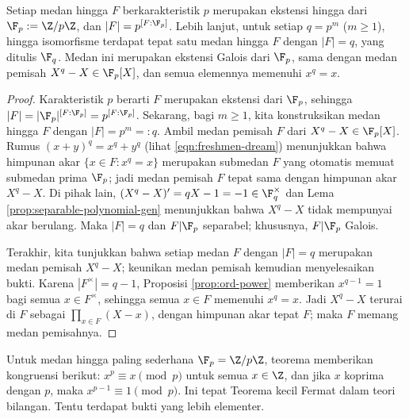 \begin{theorem}\label{prop:finite-field-uniqueness} 
	Setiap medan hingga $F$ berkarakteristik $p$ merupakan ekstensi hingga dari $\F_p:=\Z/p\Z$, dan $|F|=p^{[F:\F_p]}$. Lebih lanjut, untuk setiap $q=p^m$ ($m\geq1$), hingga isomorfisme terdapat tepat satu medan hingga $F$ dengan $|F|=q$, yang ditulis $\F_q$. Medan ini merupakan ekstensi Galois dari $\F_p$, sama dengan medan pemisah $X^q-X\in\F_p[X]$, dan semua elemennya memenuhi $x^q=x$.
\end{theorem}
\begin{proof}
	Karakteristik $p$ berarti $F$ merupakan ekstensi dari $\F_p$, sehingga $|F|=|\F_p|^{[F:\F_p]}=p^{[F:\F_p]}$. Sekarang, bagi $m\geq1$, kita konstruksikan medan hingga $F$ dengan $|F|=p^m=:q$. Ambil medan pemisah $F$ dari $X^q-X\in\F_p[X]$. Rumus $(x+y)^q=x^q+y^q$ (lihat \eqref{eqn:freshmen-dream}) menunjukkan bahwa himpunan akar $\{x\in F:x^q=x\}$ merupakan submedan $F$ yang otomatis memuat submedan prima $\F_p$; jadi medan pemisah $F$ tepat sama dengan himpunan akar $X^q-X$. Di pihak lain, $(X^q-X)'=qX-1=-1\in\F_q^\times$ dan Lema \ref{prop:separable-polynomial-gen} menunjukkan bahwa $X^q-X$ tidak mempunyai akar berulang. Maka $|F|=q$ dan $F|\F_p$ separabel; khususnya, $F|\F_p$ Galois.

	Terakhir, kita tunjukkan bahwa setiap medan $F$ dengan $|F|=q$ merupakan medan pemisah $X^q-X$; keunikan medan pemisah kemudian menyelesaikan bukti. Karena $|F^\times|=q-1$, Proposisi \ref{prop:ord-power} memberikan $x^{q-1}=1$ bagi semua $x\in F^\times$, sehingga semua $x\in F$ memenuhi $x^q=x$. Jadi $X^q-X$ terurai di $F$ sebagai $\prod_{x\in F}(X-x)$, dengan himpunan akar tepat $F$; maka $F$ memang medan pemisahnya.
\end{proof}

\begin{remark}\label{rem:Fermat-little} 
	Untuk medan hingga paling sederhana $\F_p=\Z/p\Z$, teorema memberikan kongruensi berikut: $x^p\equiv x\pmod p$ untuk semua $x\in\Z$, dan jika $x$ koprima dengan $p$, maka $x^{p-1}\equiv1\pmod p$. Ini tepat Teorema kecil Fermat dalam teori bilangan. Tentu terdapat bukti yang lebih elementer.
\end{remark}

